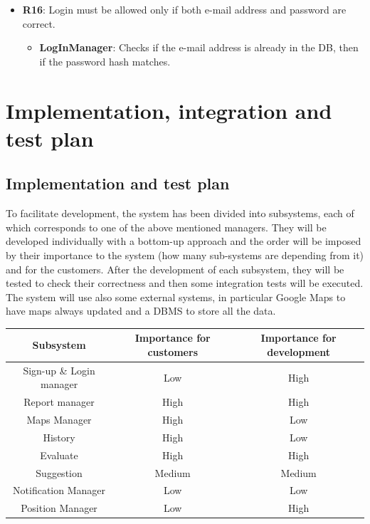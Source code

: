 \documentclass[12pt,a4paper]{report}
\begin{document}
\begin{itemize}
	\item\textbf{R16}: Login must be allowed only if both e-mail address and password are correct.
		\begin{itemize}
		\item\textbf{LogInManager}: Checks if the e-mail address is already in the DB, then if the password hash matches.
		\end{itemize}
	\end{itemize}

	\chapter{Implementation, integration and test plan}
		\section{Implementation and test plan}
			To facilitate development, the system has been divided into subsystems, each of which corresponds to one of the
			above mentioned managers. They will be developed individually with a bottom-up approach and the order will be
			imposed by their importance to the system (how many sub-systems are depending from it) and for the customers.
			After the development of each subsystem, they will be tested to check their correctness and then
			some integration tests  will be executed. The system will use also some external systems, in particular Google Maps to have maps
			always updated and a DBMS to store all the data.
			\begin{table}[H]
				\centering
				\begin{tabular}[width = \textwidth, position = center]{|c|c|c|}
					\hline
					{Subsystem} & {Importance for customers} & {Importance for development}\\
					\hline
					\hline
					Sign-up \& Login manager & Low & High\\
					\hline
					Report manager & High & High\\
					\hline
					Maps Manager & High & Low\\
					\hline
					History & High & Low\\
					\hline
					Evaluate & High & High\\
					\hline
					Suggestion & Medium & Medium\\
					\hline
					Notification Manager & Low & Low\\
					\hline
					Position Manager & Low & High\\
					\hline
				\end{tabular}
				\label{tab: }
			\end{table}
\end{document}
